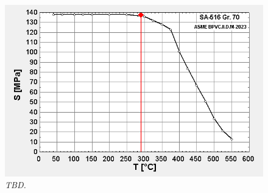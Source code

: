 \begin{figure}[ht]
     \centerline{\includegraphics[scale=0.6]{mat_prop_example_01.png}}
     \caption{\textit{TBD.}}
     \label{im:mat_prop_example_01}
\end{figure}


